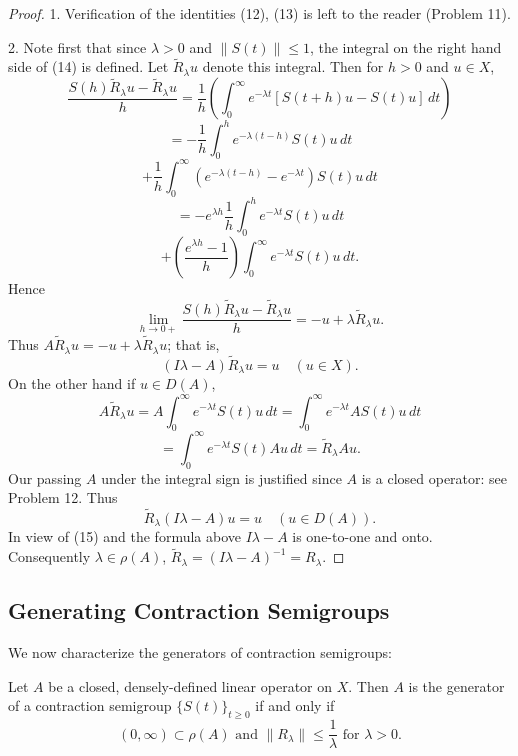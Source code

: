 \begin{proof}
1. Verification of the identities (12), (13) is left to the reader (Problem 11).

2. Note first that since $\lambda > 0$ and $\|S(t)\| \leq 1$, the integral on the right hand side of (14) is defined. Let $\tilde{R}_\lambda u$ denote this integral. Then for $h > 0$ and $u \in X$,
\[
\frac{S(h)\tilde{R}_\lambda u - \tilde{R}_\lambda u}{h} = \frac{1}{h}\left(\int_0^\infty e^{-\lambda t}[S(t+h)u - S(t)u]\,dt\right)
\]
\[
= -\frac{1}{h}\int_0^h e^{-\lambda(t-h)}S(t)u\,dt
\]
\[
+ \frac{1}{h}\int_0^\infty (e^{-\lambda(t-h)} - e^{-\lambda t})S(t)u\,dt
\]
\[
= -e^{\lambda h}\frac{1}{h}\int_0^h e^{-\lambda t}S(t)u\,dt
\]
\[
+ \left(\frac{e^{\lambda h}-1}{h}\right)\int_0^\infty e^{-\lambda t}S(t)u\,dt.
\]
Hence
\[
\lim_{h \to 0+} \frac{S(h)\tilde{R}_\lambda u - \tilde{R}_\lambda u}{h} = -u + \lambda\tilde{R}_\lambda u.
\]
Thus $A\tilde{R}_\lambda u = -u + \lambda\tilde{R}_\lambda u$; that is,
\[
(I\lambda - A)\tilde{R}_\lambda u = u \quad (u \in X).
\tag{15}
\]
On the other hand if $u \in D(A)$,
\[
A\tilde{R}_\lambda u = A\int_0^\infty e^{-\lambda t}S(t)u\,dt = \int_0^\infty e^{-\lambda t}AS(t)u\,dt
\tag{16}
\]
\[
= \int_0^\infty e^{-\lambda t}S(t)Au\,dt = \tilde{R}_\lambda Au.
\]
Our passing $A$ under the integral sign is justified since $A$ is a closed operator: see Problem 12. Thus
\[
\tilde{R}_\lambda(I\lambda - A)u = u \quad (u \in D(A)).
\]
In view of (15) and the formula above $I\lambda - A$ is one-to-one and onto. Consequently $\lambda \in \rho(A)$, $\tilde{R}_\lambda = (I\lambda - A)^{-1} = R_\lambda$.
\end{proof}

\subsection{Generating Contraction Semigroups}
\label{sec:generating-contraction-semigroups}

We now characterize the generators of contraction semigroups:

\begin{theorem}
\label{thm:hille-yosida-theorem}
Let $A$ be a closed, densely-defined linear operator on $X$. Then $A$ is the generator of a contraction semigroup $\{S(t)\}_{t \geq 0}$ if and only if
\[
(0,\infty) \subset \rho(A) \text{ and } \|R_\lambda\| \leq \frac{1}{\lambda} \text{ for } \lambda > 0.
\tag{17}
\]
\end{theorem}

